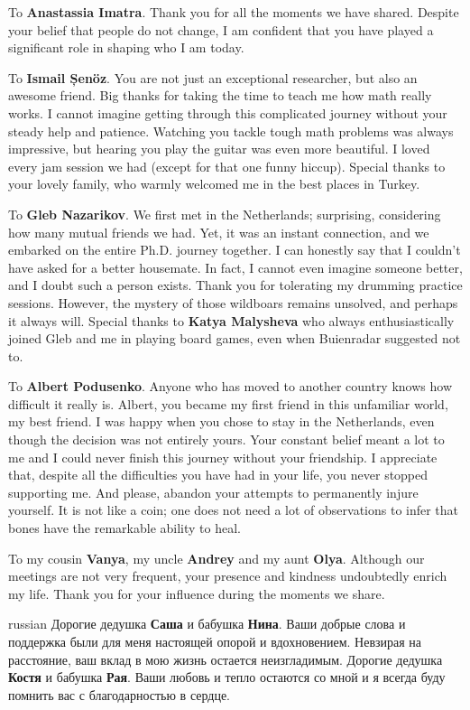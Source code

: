 To \textbf{Anastassia Imatra}.
Thank you for all the moments we have shared.
Despite your belief that people do not change, I am confident that you have played a significant role in shaping who I am today. 

To \textbf{Ismail Șenöz}. You are not just an exceptional researcher, but also an awesome friend. 
Big thanks for taking the time to teach me how math really works. 
I cannot imagine getting through this complicated journey without your steady help and patience.
Watching you tackle tough math problems was always impressive, but hearing you play the guitar was even more beautiful. 
I loved every jam session we had (except for that one funny hiccup).
Special thanks to your lovely family, who warmly welcomed me in the best places in Turkey.

To \textbf{Gleb Nazarikov}. We first met in the Netherlands; surprising, considering how many mutual friends we had. Yet, it was an instant connection, and we embarked on the entire Ph.D. journey together. I can honestly say that I couldn't have asked for a better housemate. In fact, I cannot even imagine someone better, and I doubt such a person exists. Thank you for tolerating my drumming practice sessions. However, the mystery of those wildboars remains unsolved, and perhaps it always will. Special thanks to \textbf{Katya Malysheva} who always enthusiastically joined Gleb and me in playing board games, even when Buienradar suggested not to.

To \textbf{Albert Podusenko}. Anyone who has moved to another country knows how difficult it really is.
Albert, you became my first friend in this unfamiliar world, my best friend.
I was happy when you chose to stay in the Netherlands, even though the decision was not entirely yours. 
Your constant belief meant a lot to me and I could never finish this journey without your friendship.
I appreciate that, despite all the difficulties you have had in your life, you never stopped supporting me.
And please, abandon your attempts to permanently injure yourself. 
It is not like a coin; one does not need a lot of observations to infer that bones have the remarkable ability to heal.

To my cousin \textbf{Vanya}, my uncle \textbf{Andrey} and my aunt \textbf{Olya}. 
Although our meetings are not very frequent, your presence and kindness undoubtedly enrich my life. 
Thank you for your influence during the moments we share.

\begin{otherlanguage*}{russian}
\textsf{Дорогие дедушка \textsf{\textbf{Саша}} и бабушка \textsf{\textbf{Нина}}.
Ваши добрые слова и поддержка были для меня настоящей опорой и вдохновением.
Невзирая на расстояние, ваш вклад в мою жизнь остается неизгладимым. 
Дорогие дедушка \textsf{\textbf{Костя}} и бабушка \textsf{\textbf{Рая}}.
Ваши любовь и тепло остаются со мной и я всегда буду помнить вас с благодарностью в сердце.
}
\end{otherlanguage*}


